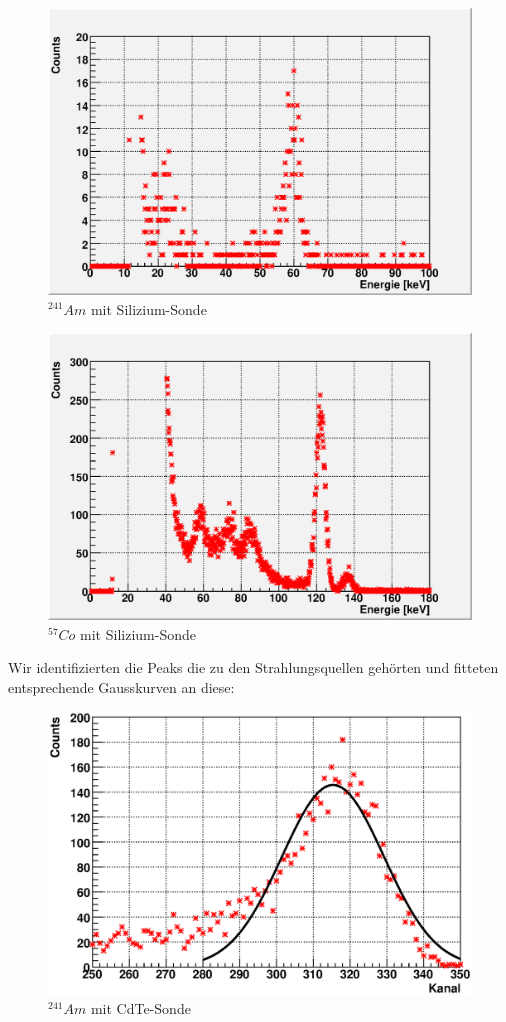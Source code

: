 \documentclass[12pt]{article}
\begin{document}
\begin{figure}[H]
\centering
\includegraphics[width=0.9\linewidth]{pictures/gamma/scaled_si_am.eps}
\caption{$^{241}Am$ mit Silizium-Sonde}
\end{figure}

\begin{figure}[H]
\centering
\includegraphics[width=0.9\linewidth]{pictures/gamma/scaled_si_co.eps}
\caption{$^{57}Co$ mit Silizium-Sonde}
\end{figure}

Wir identifizierten die Peaks die zu den Strahlungsquellen gehörten und fitteten entsprechende Gausskurven an diese:

\begin{figure}[H]
\centering
\includegraphics[width=0.9\linewidth]{../plot/eps/gamma/cdte_am.eps}
\caption{$^{241}Am$ mit CdTe-Sonde}
\end{figure}
\end{document}
